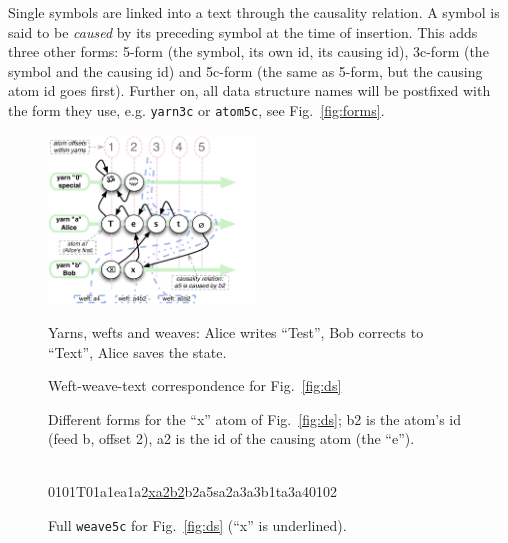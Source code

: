 \documentclass{sig-alternate}
\begin{document}
Single symbols are linked into a text through the causality relation.
A symbol is said to be \emph{caused} by its preceding symbol at the time of insertion.
This adds three other forms: 5-form (the symbol, its own id, its causing id), 3c-form (the symbol and the causing id) and 5c-form (the same as 5-form, but the causing atom id goes first).
Further on, all data structure names will be postfixed with the form they use, e.g. {\tt yarn3c} or {\tt atom5c}, see Fig.~\ref{fig:forms}.

\begin{figure}[t]
\includegraphics[width=0.49\textwidth]{feedsnweaves-5.pdf}
\caption{Yarns, wefts and weaves: Alice writes ``Test'', Bob corrects to ``Text'', Alice saves the state. \label{fig:ds} }

\caption{Weft-weave-text correspondence for Fig.~\ref{fig:ds} \label{fig:wwt}}

\caption {Different forms for the ``x'' atom of Fig.~\ref{fig:ds}; b2 is the atom's id (feed b, offset 2), a2 is the id of the causing atom (the ``e''). \label{fig:forms}}
~\\
{ {\aum}0101{T}01a1{e}a1a2{\underline{xa2b2}}{\zero}b2a5{s}a2a3{\bsp}a3b1{t}a3a4{\eoa}0102 }
\caption{ Full {\tt weave5c} for Fig.~\ref{fig:ds} (``x'' is underlined). \label{fig:w5c} }
\end{figure}
\end{document}
